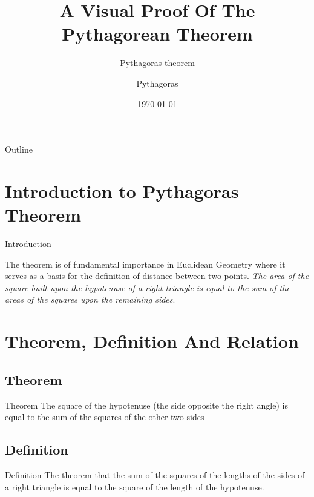 \documentclass[10pt]{beamer}
\title[Pythagoras theorem 2]{A Visual Proof Of The Pythagorean Theorem}
\subtitle{Pythagoras theorem}
\author[Pythagoras of Samos]{Pythagoras}
\date{\today}
\begin{document}
\begin{frame}
	\titlepage			%
\end{frame}

\begin{frame}{Outline}
	\tableofcontents
\end{frame}

\section{Introduction to Pythagoras Theorem}

\begin{frame}{Introduction}
\label{sec:intro}


The theorem is of fundamental importance in Euclidean Geometry where it serves 
as a basis for the definition of distance between two points.
\emph{The area of the square built upon the hypotenuse of a right
triangle is equal to the sum of the areas of the squares upon the
remaining sides}.
\end{frame}

\section{Theorem, Definition And Relation}
\label{sec:def}
\subsection{Theorem}
\begin{frame}{Theorem}
The square of the hypotenuse (the side opposite the right angle) is equal to the sum of the squares of the other two sides
\end{frame}

\subsection{Definition}
\begin{frame}{Definition}
The theorem that the sum of the squares of the lengths of the sides of a right triangle is equal to the square of the length of the hypotenuse.
\end{frame}
\end{document}
